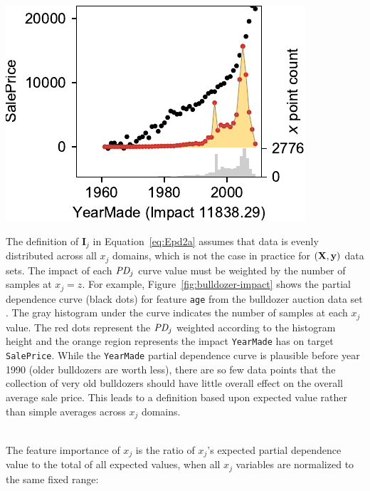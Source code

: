 \documentclass[twoside,11pt]{article}
\newcommand{\figref}[1]{Figure~\ref{#1}}
\newcommand{\eqnref}[1]{Equation~\ref{#1}}
\newcommand{\Imp}{\mathbf{I}}
\begin{document}
\begin{minipage}[t]{0.35\textwidth}
\centering
\vspace{1em}
\includegraphics[scale=0.7]{images/bulldozer-impact-YearMade.pdf}
\label{fig:bulldozer-impact}
\end{minipage}

The definition of $\Imp_j$ in \eqnref{eq:Epd2a} assumes that data is evenly distributed across all $x_j$ domains, which is not the case in practice for $(\bf X, y)$ data sets.  The impact of each $\text{\it PD}_j$ curve value must be weighted by the number of samples at $x_j=z$.  For example, \figref{fig:bulldozer-impact} shows the partial dependence curve (black dots) for feature {\tt\small age} from the bulldozer auction data set \cite{bulldozer}. The gray histogram under the curve indicates the number of samples at each $x_j$ value. The red dots represent the $\text{\it PD}_j$ weighted according to the histogram height and the orange region represents the impact {\tt\small YearMade} has on target {\tt\small SalePrice}. While the {\tt\small YearMade} partial dependence curve is plausible before year 1990 (older bulldozers are worth less), there are so few data points that the collection of very old bulldozers should have little overall effect on the overall average sale price.  This leads to a definition based upon expected value rather than simple averages across $x_j$ domains.

~\\
 The feature importance of $x_j$ is the ratio of $x_j$'s expected partial dependence value to the total of all expected values, when all $x_j$ variables are normalized to the same fixed range:
\end{document}
